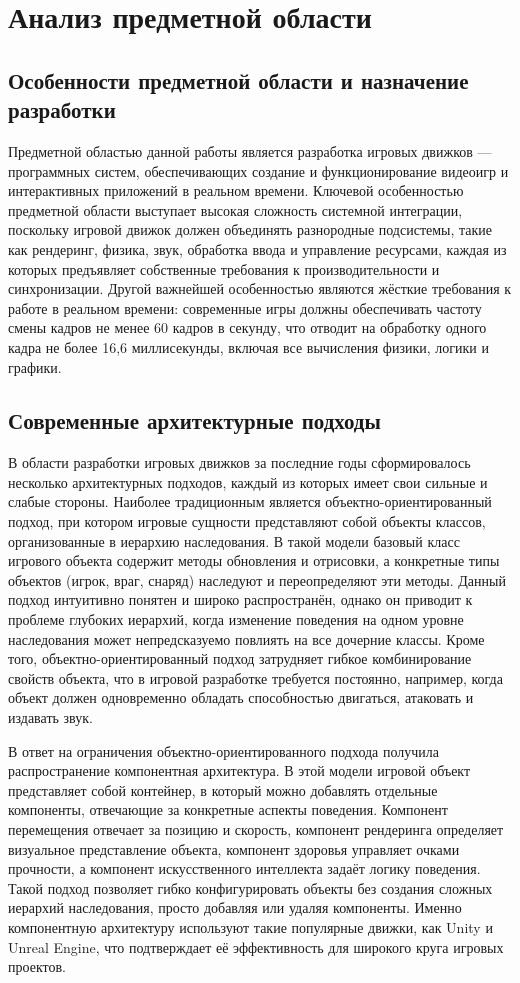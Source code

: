 \section{Анализ предметной области}

\subsection{Особенности предметной области и назначение разработки}
Предметной областью данной работы является разработка игровых движков — программных систем, обеспечивающих создание и функционирование видеоигр и интерактивных приложений в реальном времени. Ключевой особенностью предметной области выступает высокая сложность системной интеграции, поскольку игровой движок должен объединять разнородные подсистемы, такие как рендеринг, физика, звук, обработка ввода и управление ресурсами, каждая из которых предъявляет собственные требования к производительности и синхронизации. Другой важнейшей особенностью являются жёсткие требования к работе в реальном времени: современные игры должны обеспечивать частоту смены кадров не менее 60 кадров в секунду, что отводит на обработку одного кадра не более 16,6 миллисекунды, включая все вычисления физики, логики и графики.

\subsection{Современные архитектурные подходы}
В области разработки игровых движков за последние годы сформировалось несколько архитектурных подходов, каждый из которых имеет свои сильные и слабые стороны. Наиболее традиционным является объектно-ориентированный подход, при котором игровые сущности представляют собой объекты классов, организованные в иерархию наследования. В такой модели базовый класс игрового объекта содержит методы обновления и отрисовки, а конкретные типы объектов (игрок, враг, снаряд) наследуют и переопределяют эти методы. Данный подход интуитивно понятен и широко распространён, однако он приводит к проблеме глубоких иерархий, когда изменение поведения на одном уровне наследования может непредсказуемо повлиять на все дочерние классы. Кроме того, объектно-ориентированный подход затрудняет гибкое комбинирование свойств объекта, что в игровой разработке требуется постоянно, например, когда объект должен одновременно обладать способностью двигаться, атаковать и издавать звук.

В ответ на ограничения объектно-ориентированного подхода получила распространение компонентная архитектура. В этой модели игровой объект представляет собой контейнер, в который можно добавлять отдельные компоненты, отвечающие за конкретные аспекты поведения. Компонент перемещения отвечает за позицию и скорость, компонент рендеринга определяет визуальное представление объекта, компонент здоровья управляет очками прочности, а компонент искусственного интеллекта задаёт логику поведения. Такой подход позволяет гибко конфигурировать объекты без создания сложных иерархий наследования, просто добавляя или удаляя компоненты. Именно компонентную архитектуру используют такие популярные движки, как Unity и Unreal Engine, что подтверждает её эффективность для широкого круга игровых проектов.

